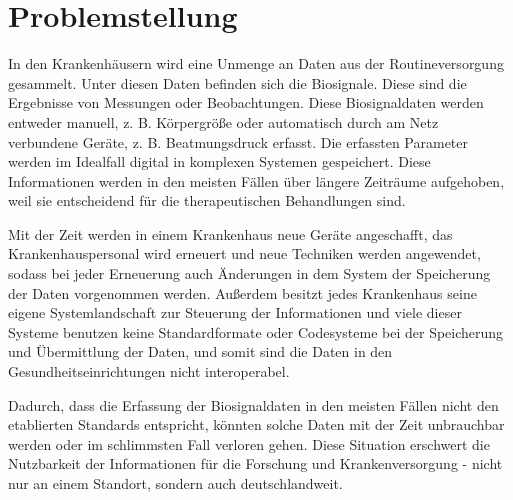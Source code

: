 \section{Problemstellung} \label{sec:problem}

In den Krankenhäusern wird eine Unmenge an Daten aus der Routineversorgung gesammelt. Unter diesen Daten befinden sich die Biosignale. Diese sind die Ergebnisse von Messungen oder Beobachtungen. Diese Biosignaldaten werden entweder manuell, z. B. Körpergröße oder automatisch durch am Netz verbundene Geräte, z. B. Beatmungsdruck erfasst. Die erfassten Parameter werden im Idealfall digital in komplexen Systemen gespeichert. Diese Informationen werden in den meisten Fällen über längere Zeiträume aufgehoben, weil sie entscheidend für die therapeutischen Behandlungen sind. 

Mit der Zeit werden in einem Krankenhaus neue Geräte angeschafft, das Krankenhauspersonal wird erneuert und neue Techniken werden angewendet, sodass bei jeder Erneuerung auch Änderungen in dem System der Speicherung der Daten vorgenommen werden. Außerdem besitzt jedes Krankenhaus seine eigene Systemlandschaft zur Steuerung der Informationen und viele dieser Systeme benutzen keine Standardformate oder Codesysteme bei der Speicherung und Übermittlung der Daten, und somit sind die Daten in den Gesundheitseinrichtungen nicht interoperabel. 

Dadurch, dass die Erfassung der Biosignaldaten in den meisten Fällen nicht den etablierten Standards entspricht, könnten solche Daten mit der Zeit unbrauchbar werden oder im schlimmsten Fall verloren gehen. Diese Situation erschwert die Nutzbarkeit der Informationen für die Forschung und Krankenversorgung - nicht nur an einem Standort, sondern auch deutschlandweit.